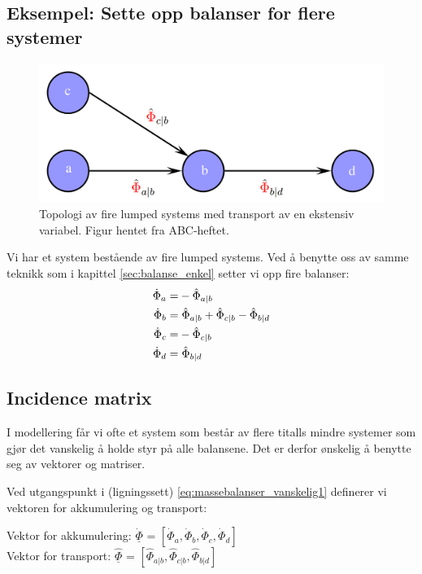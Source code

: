 \subsection{Eksempel: Sette opp balanser for flere systemer}\label{sec:flere_massebalanser}
\begin{figure}[H]
    \centering
    \includegraphics[scale=0.3]{Figures/massebalanser_flere_systemer}
    \caption{Topologi av fire lumped systems med transport av en ekstensiv variabel. Figur hentet fra ABC-heftet.}
    \label{fig:massebalanser_flersystem}
\end{figure}
Vi har et system bestående av fire lumped systems. Ved å benytte oss av samme teknikk som i kapittel \ref{sec:balanse_enkel} setter vi opp fire balanser: 
\begin{equation} 
    \begin{split}
    \label{eq:massebalanser_vanskelig1}
    \dot{\Phi}_{a} = & -\hat{\Phi}_{a|b} \\
    \dot{\Phi}_{b} = &\hspace{0.1cm} \hat{\Phi}_{a|b} + \hat{\Phi}_{c|b}-\hat{\Phi}_{b|d}\\
    \dot{\Phi}_{c} = & -\hat{\Phi}_{c|b}\\
    \dot{\Phi}_{d} = & \hspace{0.1cm}\hat{\Phi}_{b|d} \end{split}
\end{equation}


\subsection{Incidence matrix}
I modellering får vi ofte et system som består av flere titalls mindre systemer som gjør det vanskelig å holde styr på alle balansene. Det er derfor ønskelig å benytte seg av vektorer og matriser. 

Ved utgangspunkt i (ligningssett) \ref{eq:massebalanser_vanskelig1} definerer vi vektoren for akkumulering og transport:\\ 
\begin{center}
    Vektor for akkumulering: $\underline{\dot{\Phi}}$ =
$[\dot{\Phi}_a,\dot{\Phi}_b,\dot{\Phi}_c,\dot{\Phi}_d]$ \\
Vektor for transport:  $\underline{\hat{\Phi}}$ =
$[\hat{\Phi}_{a|b},\hat{\Phi}_{c|b},\hat{\Phi}_{b|d}]$
    
\end{center}

